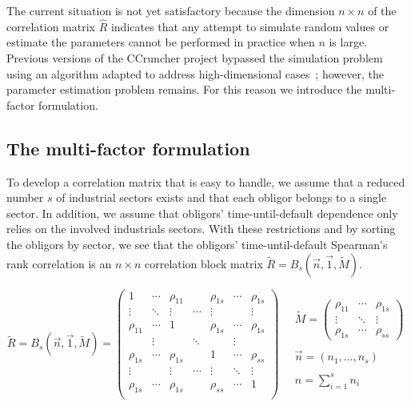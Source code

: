 \documentclass[11pt,fleqn]{book} %
\begin{document}
The current situation is not yet satisfactory because the dimension 
$n {\times} n$ of the correlation matrix $\widehat{R}$ indicates that any 
attempt to simulate random values or estimate the parameters cannot 
be performed in practice when $n$ is large. Previous versions of the 
CCruncher project bypassed the simulation problem using an algorithm 
adapted to address high-dimensional cases~\cite{torrent:2011}; however, 
the parameter estimation problem remains. For this reason we introduce 
the multi-factor formulation.

\subsection{The multi-factor formulation}

To develop a correlation matrix that is easy to handle, we assume that a 
reduced number $s$ of industrial sectors exists and that each obligor belongs 
to a single sector. In addition, we assume that obligors' time-until-default 
dependence only relies on the involved industrials sectors. With these 
restrictions and by sorting the obligors by sector, we see that the obligors' 
time-until-default Spearman's rank correlation is an $n {\times} n$ correlation
block matrix $\widetilde{R} = B_s(\vec{n},\vec{1},\widetilde{M})$.

\begin{displaymath}
	\widetilde{R} = B_s(\vec{n},\vec{1},\widetilde{M}) = 
	\left(
	\begin{array}{ccccccc}
		1         & \cdots & \rho_{11} &        & \rho_{1s} & \cdots & \rho_{1s} \\
		\vdots    & \ddots & \vdots    & \cdots & \vdots    &        & \vdots    \\
		\rho_{11} & \cdots & 1         &        & \rho_{1s} & \cdots & \rho_{1s} \\
		
		          & \vdots &           & \ddots &           & \vdots &           \\
		
		\rho_{1s} & \cdots & \rho_{1s} &        & 1         & \cdots & \rho_{ss} \\
		\vdots    &        & \vdots    & \cdots & \vdots    & \ddots & \vdots    \\
		\rho_{1s} & \cdots & \rho_{1s} &        & \rho_{ss} & \cdots & 1         \\
	\end{array}
	\right)
	\quad 
	\begin{array}{l}
		\widetilde{M} = 
		\left(
		\begin{array}{ccc}
			\rho_{11} & \cdots & \rho_{1s} \\
			\vdots    & \ddots & \vdots    \\
			\rho_{1s} & \cdots & \rho_{ss}
		\end{array}
		\right) \\
		\\
		\vec{n} = (n_1,\dots,n_s) \\
		\\
		n = \displaystyle \sum_{i=1}^{s} n_i
	\end{array}
\end{displaymath}
\end{document}
